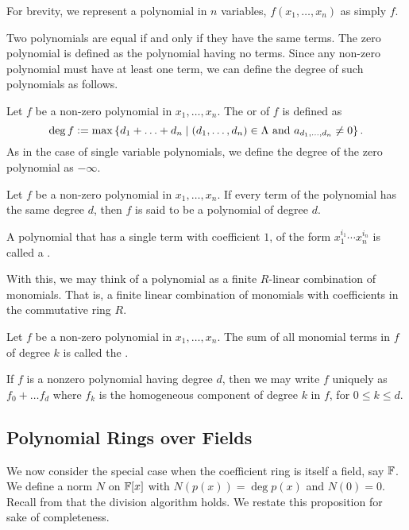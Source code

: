 For brevity, we represent a polynomial in $n$ variables, $f(x_1, \ldots, x_n)$ as simply $f$.

Two polynomials are equal if and only if they have the same terms. The zero polynomial is defined as the polynomial having no terms. Since any non-zero polynomial must have at least one term, we can define the degree of such polynomials as follows.
\begin{defn}
   Let $f$ be a non-zero polynomial in $x_1,\ldots,x_n$. The  or  of $f$ is defined as
   \[
        \deg f \vcentcolon= \max\left\{ d_1 + \ldots + d_n \mid (d_1, \ldots, d_n) \in \Lambda \text{ and } a_{d_1, \ldots, d_n} \neq 0 \right\}.
   \]
   As in the case of single variable polynomials, we define the degree of the zero polynomial as $-\infty$.
\end{defn}

\begin{defn}
   Let $f$ be a non-zero polynomial in $x_1, \ldots, x_n$. If every term of the polynomial has the same degree $d$, then $f$ is said to be a  polynomial of degree $d$.
\end{defn}

\begin{defn}
   A polynomial that has a single term with coefficient $1$, of the form $x_1^{i_1} \cdots x_n^{i_n}$ is called a .
\end{defn}



With this, we may think of a polynomial as a finite $R$-linear combination of monomials. That is, a finite linear combination of monomials with coefficients in the commutative ring $R$. 

\begin{defn}
   Let $f$ be a non-zero polynomial in $x_1, \ldots, x_n$. The sum of all monomial terms in $f$ of degree $k$ is called the .
\end{defn}

If $f$ is a nonzero polynomial having degree $d$, then we may write $f$ uniquely as $f_0 + \ldots f_d$ where $f_k$ is the homogeneous component of degree $k$ in $f$, for $0 \leq k \leq d$.

\subsection{Polynomial Rings over Fields}

We now consider the special case when the coefficient ring is itself a field, say $\mathbb{F}$. We define a norm $N$ on $\mathbb{F}[x]$ with $N(p(x)) = \deg p(x)$ and $N(0) = 0$. Recall from  that the division algorithm holds. We restate this proposition for sake of completeness.

